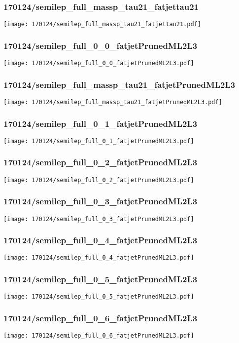 \begin{frame}
   \frametitle{\small 170124/semilep\_full\_massp\_tau21\_fatjettau21}
   \centering
   \texttt{[image: 170124/semilep\_full\_massp\_tau21\_fatjettau21.pdf]}
\end{frame}

\begin{frame}
   \frametitle{\small 170124/semilep\_full\_0\_0\_fatjetPrunedML2L3}
   \centering
   \texttt{[image: 170124/semilep\_full\_0\_0\_fatjetPrunedML2L3.pdf]}
\end{frame}

\begin{frame}
   \frametitle{\small 170124/semilep\_full\_massp\_tau21\_fatjetPrunedML2L3}
   \centering
   \texttt{[image: 170124/semilep\_full\_massp\_tau21\_fatjetPrunedML2L3.pdf]}
\end{frame}

\begin{frame}
   \frametitle{\small 170124/semilep\_full\_0\_1\_fatjetPrunedML2L3}
   \centering
   \texttt{[image: 170124/semilep\_full\_0\_1\_fatjetPrunedML2L3.pdf]}
\end{frame}

\begin{frame}
   \frametitle{\small 170124/semilep\_full\_0\_2\_fatjetPrunedML2L3}
   \centering
   \texttt{[image: 170124/semilep\_full\_0\_2\_fatjetPrunedML2L3.pdf]}
\end{frame}

\begin{frame}
   \frametitle{\small 170124/semilep\_full\_0\_3\_fatjetPrunedML2L3}
   \centering
   \texttt{[image: 170124/semilep\_full\_0\_3\_fatjetPrunedML2L3.pdf]}
\end{frame}

\begin{frame}
   \frametitle{\small 170124/semilep\_full\_0\_4\_fatjetPrunedML2L3}
   \centering
   \texttt{[image: 170124/semilep\_full\_0\_4\_fatjetPrunedML2L3.pdf]}
\end{frame}

\begin{frame}
   \frametitle{\small 170124/semilep\_full\_0\_5\_fatjetPrunedML2L3}
   \centering
   \texttt{[image: 170124/semilep\_full\_0\_5\_fatjetPrunedML2L3.pdf]}
\end{frame}

\begin{frame}
   \frametitle{\small 170124/semilep\_full\_0\_6\_fatjetPrunedML2L3}
   \centering
   \texttt{[image: 170124/semilep\_full\_0\_6\_fatjetPrunedML2L3.pdf]}
\end{frame}

